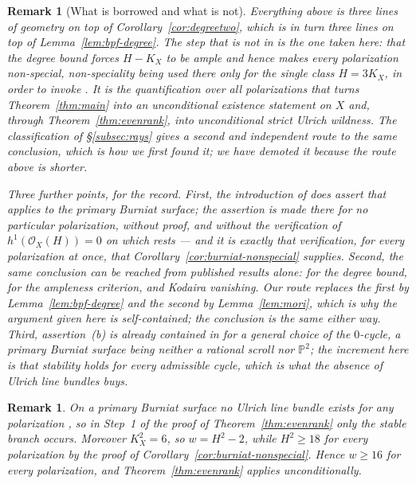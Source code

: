 \documentclass[10pt,a4paper]{amsart}
\newtheorem{remark}[theorem]{Remark}
\newcommand{\OO}{\mathcal{O}}
\newcommand{\PP}{\mathbb{P}}
\begin{document}
\begin{remark}[What is borrowed and what is not]\label{rem:cho-nonspecial}
Everything above is three lines of geometry on top of Corollary~\ref{cor:degreetwo}, which is in turn three lines on top of Lemma~\ref{lem:bpf-degree}. The step that is not in \cite{Cho26} is the one taken here: that the degree bound forces $H-K_X$ to be ample and hence makes \emph{every} polarization non-special, non-speciality being used there only for the single class $H=3K_X$, in order to invoke \cite{Cas17}. It is the quantification over all polarizations that turns Theorem~\ref{thm:main} into an unconditional existence statement on $X$ and, through Theorem~\ref{thm:evenrank}, into unconditional strict Ulrich wildness. The classification of \S\ref{subsec:rays} gives a second and independent route to the same conclusion, which is how we first found it; we have demoted it because the route above is shorter.

Three further points, for the record. First, the introduction of \cite{Cho26} does assert that \cite{Cas17} applies to the primary Burniat surface; the assertion is made there for no particular polarization, without proof, and without the verification of $h^1(\OO_X(H))=0$ on which \cite{Cas17} rests --- and it is exactly that verification, for every polarization at once, that Corollary~\ref{cor:burniat-nonspecial} supplies. Second, the same conclusion can be reached from published results alone: \cite[Prop.~5.4]{Cho26} for the degree bound, \cite[Prop.~4.2]{Cho26} for the ampleness criterion, and Kodaira vanishing. Our route replaces the first by Lemma~\ref{lem:bpf-degree} and the second by Lemma~\ref{lem:mori}, which is why the argument given here is self-contained; the conclusion is the same either way. Third, assertion~(b) is already contained in \cite[Thm.~1.2]{Cas17} for a general choice of the $0$-cycle, a primary Burniat surface being neither a rational scroll nor $\PP^2$; the increment here is that stability holds for \emph{every} admissible cycle, which is what the absence of Ulrich line bundles buys.
\end{remark}

\begin{remark}\label{rem:wild-burniat}
On a primary Burniat surface no Ulrich line bundle exists for any polarization \cite[Thm.~5.5]{Cho26}, so in Step~1 of the proof of Theorem~\ref{thm:evenrank} only the stable branch occurs. Moreover $K_X^2=6$, so $w=H^2-2$, while $H^2\ge18$ for every polarization by the proof of Corollary~\ref{cor:burniat-nonspecial}. Hence $w\ge16$ for \emph{every} polarization, and Theorem~\ref{thm:evenrank} applies unconditionally.
\end{remark}
\end{document}
